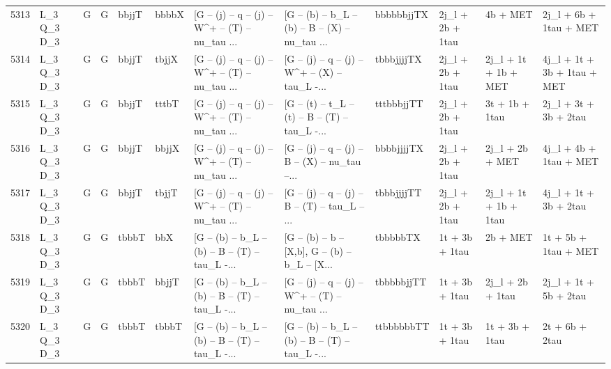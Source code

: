 \begin{tabular}{llllllllllll}
5313 &  L\_3 Q\_3 D\_3 &     G &     G &       bbjjT &       bbbbX &  [G -- (j) -- q -- (j) -- W\textasciicircum + -- (T) -- nu\_tau ... &  [G -- (b) -- b\_L -- (b) -- B -- (X) -- nu\_tau ... &  bbbbbbjjTX &         2j\_l + 2b + 1tau &                 4b + MET &             2j\_l + 6b + 1tau + MET \\
5314 &  L\_3 Q\_3 D\_3 &     G &     G &       bbjjT &       tbjjX &  [G -- (j) -- q -- (j) -- W\textasciicircum + -- (T) -- nu\_tau ... &  [G -- (j) -- q -- (j) -- W\textasciicircum + -- (X) -- tau\_L -... &  tbbbjjjjTX &         2j\_l + 2b + 1tau &     2j\_l + 1t + 1b + MET &        4j\_l + 1t + 3b + 1tau + MET \\
5315 &  L\_3 Q\_3 D\_3 &     G &     G &       bbjjT &       tttbT &  [G -- (j) -- q -- (j) -- W\textasciicircum + -- (T) -- nu\_tau ... &  [G -- (t) -- t\_L -- (t) -- B -- (T) -- tau\_L -... &  tttbbbjjTT &         2j\_l + 2b + 1tau &           3t + 1b + 1tau &              2j\_l + 3t + 3b + 2tau \\
5316 &  L\_3 Q\_3 D\_3 &     G &     G &       bbjjT &       bbjjX &  [G -- (j) -- q -- (j) -- W\textasciicircum + -- (T) -- nu\_tau ... &  [G -- (j) -- q -- (j) -- B -- (X) -- nu\_tau --... &  bbbbjjjjTX &         2j\_l + 2b + 1tau &          2j\_l + 2b + MET &             4j\_l + 4b + 1tau + MET \\
5317 &  L\_3 Q\_3 D\_3 &     G &     G &       bbjjT &       tbjjT &  [G -- (j) -- q -- (j) -- W\textasciicircum + -- (T) -- nu\_tau ... &  [G -- (j) -- q -- (j) -- B -- (T) -- tau\_L -- ... &  tbbbjjjjTT &         2j\_l + 2b + 1tau &    2j\_l + 1t + 1b + 1tau &              4j\_l + 1t + 3b + 2tau \\
5318 &  L\_3 Q\_3 D\_3 &     G &     G &       tbbbT &         bbX &  [G -- (b) -- b\_L -- (b) -- B -- (T) -- tau\_L -... &  [G -- (b) -- b -- [X,b], G -- (b) -- b\_L -- [X... &    tbbbbbTX &           1t + 3b + 1tau &                 2b + MET &               1t + 5b + 1tau + MET \\
5319 &  L\_3 Q\_3 D\_3 &     G &     G &       tbbbT &       bbjjT &  [G -- (b) -- b\_L -- (b) -- B -- (T) -- tau\_L -... &  [G -- (j) -- q -- (j) -- W\textasciicircum + -- (T) -- nu\_tau ... &  tbbbbbjjTT &           1t + 3b + 1tau &         2j\_l + 2b + 1tau &              2j\_l + 1t + 5b + 2tau \\
5320 &  L\_3 Q\_3 D\_3 &     G &     G &       tbbbT &       tbbbT &  [G -- (b) -- b\_L -- (b) -- B -- (T) -- tau\_L -... &  [G -- (b) -- b\_L -- (b) -- B -- (T) -- tau\_L -... &  ttbbbbbbTT &           1t + 3b + 1tau &           1t + 3b + 1tau &                     2t + 6b + 2tau \\

\end{tabular}
